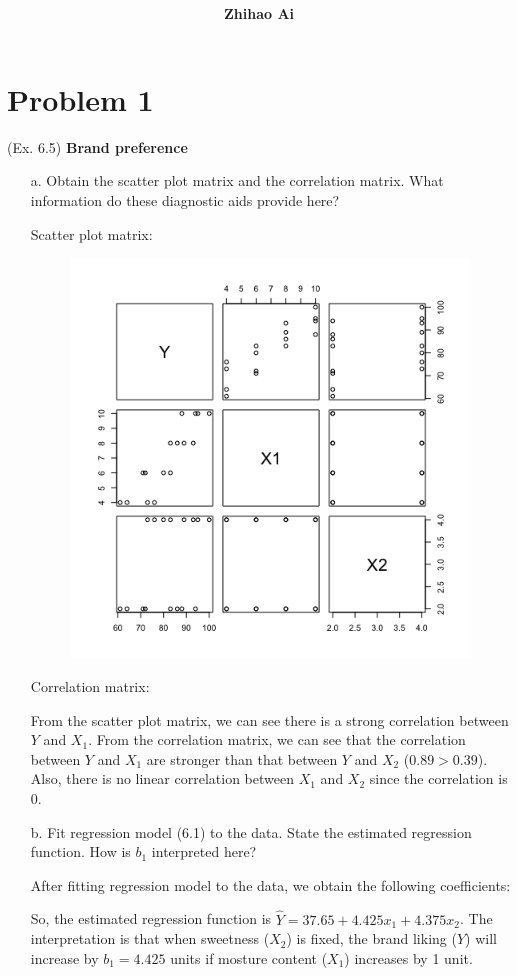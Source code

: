 \documentclass[10pt]{report}
\title{
	\vspace{2in}
	\textmd{\textbf{\hwCourse\\\hwTitle}}\\
	\vspace{0.3in}\large{\textit{\hmClassInstructor}}
	\vspace{3in}
}
\author{\textbf{Zhihao Ai}}
\date{}
\begin{document}
\maketitle

\section*{Problem 1}
(Ex. 6.5) \textbf{Brand preference}
\begin{enumerate}
	\item [a.]
	Obtain the scatter plot matrix and the correlation matrix. What information do these diagnostic aids provide here?
	
	Scatter plot matrix:
	\begin{figure}[H]
		\centering
		\vspace{-4ex}
		\includegraphics[width=.5\linewidth]{p1/5a.png}
		\vspace{-5ex}
	\end{figure}
	Correlation matrix:
	
	From the scatter plot matrix, we can see there is a strong correlation between $Y$ and $X_1$. From the correlation matrix, we can see that the correlation between $Y$ and $X_1$ are stronger than that between $Y$ and $X_2$ ($0.89>0.39$). Also, there is no linear correlation between $X_1$ and $X_2$ since the correlation is 0.
	
	\item [b.]
	Fit regression model (6.1) to the data. State the estimated regression function. How is $b_1$ interpreted here?
	
	After fitting regression model to the data, we obtain the following coefficients:
	
	So, the estimated regression function is $\hat{Y} = 37.65 + 4.425 x_1 + 4.375 x_2$. The interpretation is that when sweetness ($X_2$) is fixed, the brand liking ($Y$) will increase by $b_1 = 4.425$ units if mosture content ($X_1$) increases by 1 unit.
	

\end{enumerate}
\end{document}
